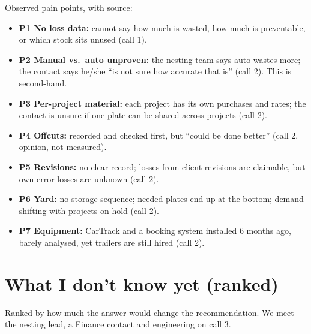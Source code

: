 \documentclass[10pt,a4paper]{article}
\begin{document}
Observed pain points, with source:
\begin{itemize}
\item \textbf{P1 No loss data:} cannot say how much is wasted, how much is preventable, or which stock sits unused (call 1).
\item \textbf{P2 Manual vs.\ auto unproven:} the nesting team says auto wastes more; the contact says he/she ``is not sure how accurate that is'' (call 2). This is second-hand.
\item \textbf{P3 Per-project material:} each project has its own purchases and rates; the contact is unsure if one plate can be shared across projects (call 2).
\item \textbf{P4 Offcuts:} recorded and checked first, but ``could be done better'' (call 2, opinion, not measured).
\item \textbf{P5 Revisions:} no clear record; losses from client revisions are claimable, but own-error losses are unknown (call 2).
\item \textbf{P6 Yard:} no storage sequence; needed plates end up at the bottom; demand shifting with projects on hold (call 2).
\item \textbf{P7 Equipment:} CarTrack and a booking system installed 6 months ago, barely analysed, yet trailers are still hired (call 2).
\end{itemize}

\section{What I don't know yet (ranked)}
Ranked by how much the answer would change the recommendation. We meet the nesting lead, a Finance contact and engineering on call 3.
\end{document}
